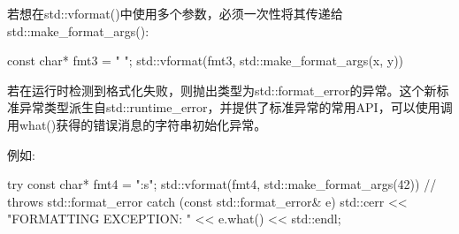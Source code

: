 若想在std::vformat()中使用多个参数，必须一次性将其传递给std::make\_format\_args():

\begin{cpp}
const char* fmt3 = "{} {}";
std::vformat(fmt3, std::make_format_args(x, y))
\end{cpp}

若在运行时检测到格式化失败，则抛出类型为std::format\_error的异常。这个新标准异常类型派生自std::runtime\_error，并提供了标准异常的常用API，可以使用调用what()获得的错误消息的字符串初始化异常。

例如:

\begin{cpp}
try {
	const char* fmt4 = "{:s}";
	std::vformat(fmt4, std::make_format_args(42)) // throws std::format_error
}
catch (const std::format_error& e) {
	std::cerr << "FORMATTING EXCEPTION: " << e.what() << std::endl;
}
\end{cpp}

















